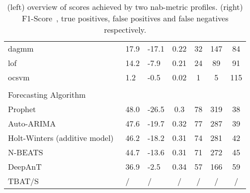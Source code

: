 \begin{table}[h]
{\begin{tabular}{lll|cccc}
            \gls{dagmm}\cite{Zong.2018}                                     & 17.9              & -17.1             & 0.22    & 32    & 147   & 84    \\
            \gls{lof}~\cite{Breunig.2000}                                   & 14.2              & -7.9              & 0.21    & 24    & 89    & 91    \\
            \acrshort{ocsvm}~\cite{Schölkopf.1999,Tax.2004}                 & 1.2               & -0.5              & 0.02    & 1     & 5     & 115   \\
            \\
            Forecasting Algorithm                                           &                   &                   &         &       &       &       \\\hline
            Prophet~\cite{Taylor.2017}                                      & 48.0              & -26.5             & 0.3     & 78    & 319   & 38    \\
            Auto-ARIMA~\cite{Smith.2017}                                    & 47.6              & -19.7             & 0.32    & 77    & 287   & 39    \\
            Holt-Winters (additive model)~\cite{Winters.1960}               & 46.2              & -18.2             & 0.31    & 74    & 281   & 42    \\
            N-BEATS~\cite{Oreshkin.2020}                                    & 44.7              & -13.6             & 0.31    & 71    & 272   & 45    \\
            DeepAnT~\cite{Munir.2019}                                       & 36.9              & -2.5              & 0.34    & 57    & 166   & 59    \\
            TBAT/S                                                          & /                 & /                 & /     & /     & /     & /     \\
        \end{tabular}
    }
    \caption[NAB-Scores achieved by the algorithms]{
    (left) overview of scores achieved by two \gls{nab}-metric profiles.
    (right) F1-Score~\cite[183]{Murphy.2012}, true positives, false positives
    and false negatives respectively.}\label{tab:results}
\end{table}
